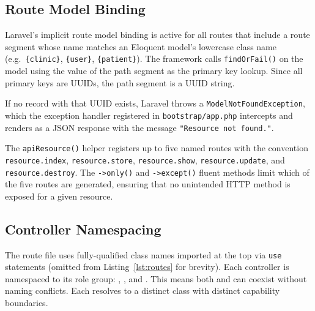 \subsection{Route Model Binding}

Laravel's implicit route model binding is active for all routes that
include a route segment whose name matches an Eloquent model's
lowercase class name (e.g.\ \texttt{\{clinic\}}, \texttt{\{user\}},
\texttt{\{patient\}}). The framework calls \texttt{findOrFail()} on
the model using the value of the path segment as the primary key lookup.
Since all primary keys are UUIDs, the path segment is a UUID string.

If no record with that UUID exists, Laravel throws a
\texttt{ModelNotFoundException}, which the exception handler registered
in \texttt{bootstrap/app.php} intercepts and renders as a \stnotfound{}
JSON response with the message \texttt{"Resource not found."}.

\begin{notebox}
  The \texttt{apiResource()} helper registers up to five named routes
  with the convention \texttt{resource.index}, \texttt{resource.store},
  \texttt{resource.show}, \texttt{resource.update}, and
  \texttt{resource.destroy}. The \texttt{->only()} and \texttt{->except()}
  fluent methods limit which of the five routes are generated, ensuring
  that no unintended HTTP method is exposed for a given resource.
\end{notebox}

\subsection{Controller Namespacing}

The route file uses fully-qualified class names imported at the top via
\texttt{use} statements (omitted from Listing~\ref{lst:routes} for
brevity). Each controller is namespaced to its role group:
,
, and
.
This means both  and
 can coexist without
naming conflicts. Each resolves to a distinct class with distinct
capability boundaries.

